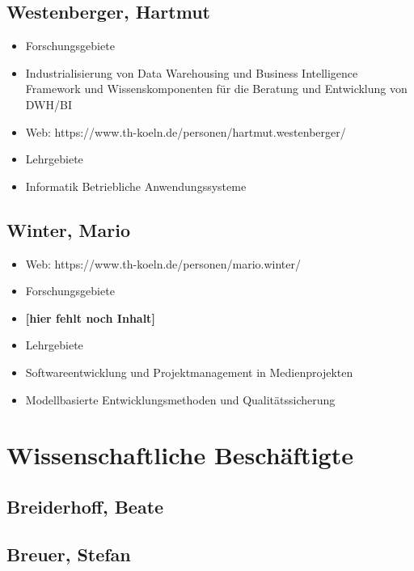 \subsection{Westenberger, Hartmut}\label{westenberger-hartmut}

\begin{itemize}
\tightlist
\item
  Forschungsgebiete
\item
  Industrialisierung von Data Warehousing und Business Intelligence
  Framework und Wissenskomponenten für die Beratung und Entwicklung von
  DWH/BI
\item
  Web: https://www.th-koeln.de/personen/hartmut.westenberger/
\item
  Lehrgebiete
\item
  Informatik Betriebliche Anwendungssysteme
\end{itemize}

\subsection{Winter, Mario}\label{winter-mario}

\begin{itemize}
\tightlist
\item
  Web: https://www.th-koeln.de/personen/mario.winter/
\item
  Forschungsgebiete
\item
  \textbf{{[}hier fehlt noch Inhalt{]}}
\item
  Lehrgebiete
\item
  Softwareentwicklung und Projektmanagement in Medienprojekten
\item
  Modellbasierte Entwicklungsmethoden und Qualitätssicherung
\end{itemize}

\section{Wissenschaftliche
Beschäftigte}\label{wissenschaftliche-beschuxe4ftigte}

\subsection{Breiderhoff, Beate}\label{breiderhoff-beate}

\subsection{Breuer, Stefan}\label{breuer-stefan}

